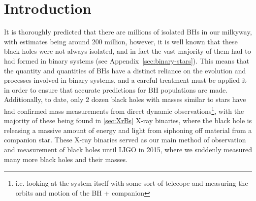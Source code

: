 \documentclass[amsmath,twocolumn]{aastex702}
\begin{document}
\begin{abstract}

  In this paper we present a number of measured properties from in-depth simulations of \gls{isolated} black holes (BHs). 
  These BHs are especially relevant currently, as both \gls{Roman} and \gls{GaiaDR4} are very likely to detect/reveal a large quantity of ones previously undiscovered. The location of these black holes will be discovered by these telescopes but as equally important is the lives which they've lived. I.e., what (and where!) were they before becoming black holes.
  This is something that is incredibly hard to do through observational means (i.e. Observing the black hole with some sort of telescope), as (most) black holes become incredibly sedentary after becoming formed, and besides some basic things like mass, there not much one can really glean from them. 
This means that its nearly impossible to`work backwards` when it comes to a figuring out how these BHs formed, and instead it must be approached from the front.
The main way to do this is to use massive very powerful simulation tools to simulate massive quantities of candidates, and then evolve said candidates and see which ones end up being what we're looking for. It's sort of like throwing a metaphorical balls into our stellar evolution plinko device, and seeing which ones land in the spot we're looking for, and then looking at how our 10-15 balls ended up there. 

\end{abstract}

\section{Introduction}

It is thoroughly predicted that there are millions of isolated
BHs in our milkyway, with estimates being around 200 million, however, it is well known that these black holes were not always isolated, and in fact the vast majority of them had to had formed in binary systems (see Appendix~\ref{sec:binary-stars}).
This means that the quantity and quantities of BHs have a distinct reliance on the evolution and processes involved in binary systems, and a careful treatment must be applied it in order to ensure that accurate predictions for BH populations are made.
Additionally, to date, only 2 dozen black holes with masses similar to stars have had confirmed mass measurements from direct dynamic observations\footnote{i.e. looking at the system itself with some sort of telecope and measuring the orbits and motion of the BH + companion}, with the majority of these being found in \ref{sec:XrBs} X-ray binaries, where the black hole is releasing a massive amount of energy and light from siphoning off material from a companion star.
These X-ray binaries served as our main method of observation and measurement of black holes until LIGO in 2015, where we suddenly measured many more black holes and their masses.
\end{document}
